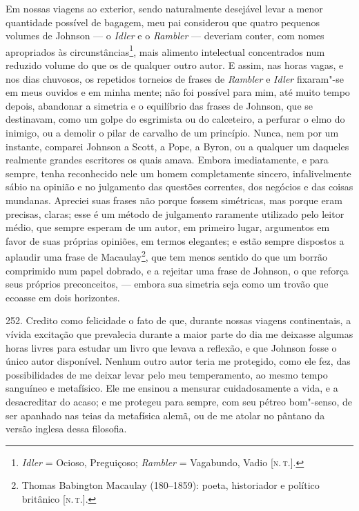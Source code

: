 Em nossas viagens ao exterior, sendo naturalmente desejável levar a
menor quantidade possível de bagagem, meu pai considerou que quatro
pequenos volumes de Johnson --- o \emph{Idler} e o \emph{Rambler} ---
deveriam conter, com nomes apropriados às circunstâncias\footnote{\emph{Idler}
  = Ocioso, Preguiçoso; \emph{Rambler} = Vagabundo, Vadio {[}\textsc{n.\,t.}{]}.}, mais alimento intelectual concentrados num reduzido volume do
que os de qualquer outro autor. E assim, nas horas vagas, e nos dias
chuvosos, os repetidos torneios de frases de \emph{Rambler} e
\emph{Idler} fixaram"-se em meus ouvidos e em minha mente; não foi
possível para mim, até muito tempo depois, abandonar a simetria e o
equilíbrio das frases de Johnson, que se destinavam, como um golpe do
esgrimista ou do calceteiro, a perfurar o elmo do inimigo, ou a demolir
o pilar de carvalho de um princípio. Nunca, nem por um instante,
comparei Johnson a Scott, a Pope, a Byron, ou a qualquer um daqueles
realmente grandes escritores os quais amava. Embora imediatamente, e
para sempre, tenha reconhecido nele um homem completamente sincero,
infalivelmente sábio na opinião e no julgamento das questões correntes,
dos negócios e das coisas mundanas. Apreciei suas frases não porque
fossem simétricas, mas porque eram precisas, claras; esse é um método de
julgamento raramente utilizado pelo leitor médio, que sempre esperam de
um autor, em primeiro lugar, argumentos em favor de suas próprias
opiniões, em termos elegantes; e estão sempre dispostos a aplaudir uma
frase de Macaulay\footnote{Thomas Babington Macaulay (180--1859): poeta,
  historiador e político britânico {[}\textsc{n.\,t.}{]}.}, que tem menos
sentido do que um borrão comprimido num papel dobrado, e a rejeitar uma
frase de Johnson, o que reforça seus próprios preconceitos, --- embora
sua simetria seja como um trovão que ecoasse em dois horizontes.

252. Credito como felicidade o fato de que, durante nossas viagens
continentais, a vívida excitação que prevalecia durante a maior parte do
dia me deixasse algumas horas livres para estudar um livro que levava a
reflexão, e que Johnson fosse o único autor disponível. Nenhum outro
autor teria me protegido, como ele fez, das possibilidades de me deixar
levar pelo meu temperamento, ao mesmo tempo sanguíneo e metafísico. Ele
me ensinou a mensurar cuidadosamente a vida, e a desacreditar do acaso;
e me protegeu para sempre, com seu pétreo bom"-senso, de ser apanhado nas
teias da metafísica alemã, ou de me atolar no pântano da versão inglesa
dessa filosofia.

